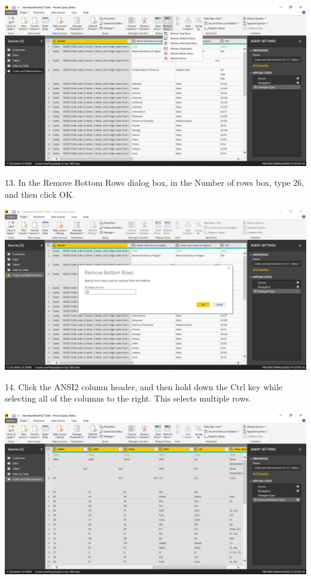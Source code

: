 	\begin{center}
	\includegraphics[width=17cm]{./Imagenes/Ejercicio1/Tarea4/8}
	\end{center}	

13. In the Remove Bottom Rows dialog box, in the Number of rows box, type 26, and then click OK.\\

	\begin{center}
	\includegraphics[width=17cm]{./Imagenes/Ejercicio1/Tarea4/9}
	\end{center}	

14. Click the ANSI2 column header, and then hold down the Ctrl key while selecting all of the columns to
the right. This selects multiple rows.\\

	\begin{center}
	\includegraphics[width=17cm]{./Imagenes/Ejercicio1/Tarea4/10}
	\end{center}	

